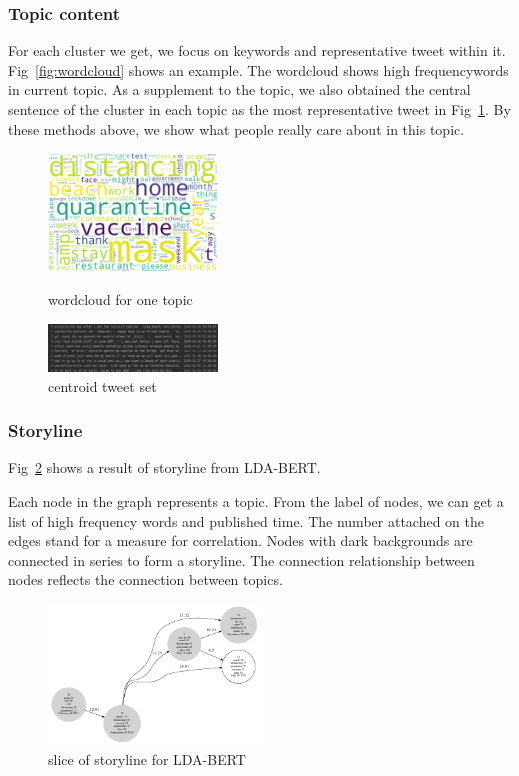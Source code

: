 \subsubsection{Topic content}
For each cluster we get, we focus on keywords and representative tweet within it. Fig~\ref{fig:wordcloud} shows an example. The wordcloud shows high frequencywords in current topic. As a supplement to the topic, we also obtained the central sentence of the cluster in each topic as the most representative tweet in Fig~\ref{fig:center_sentence}. By these methods above, we show what people really care about in this topic.
\begin{figure}
\centering
{
\includegraphics[width=0.4\textwidth]{imgs/lda_bert/Topic0_wordcloud.png}
\caption{wordcloud for one topic}
\label{fig:wordcloud}
}
\hspace{10pt}    
{
\includegraphics[width=0.4\textwidth]{imgs/lda_bert/center_sentence.png}
\caption{centroid tweet set}
\label{fig:center_sentence}
}
\hspace{10pt}
\end{figure}


\subsubsection{Storyline}
Fig~\ref{fig:storyline for lda_bert} shows a result of storyline from LDA-BERT.  

Each node in the graph represents a topic. From the label of nodes, we can get a list of high frequency words and published time. The number attached on the edges stand for a measure for correlation. Nodes with dark backgrounds are connected in series to form a storyline. The connection relationship between nodes reflects the connection between topics.

\begin{figure}[h]
\centering
\includegraphics[width=0.5\textwidth]{imgs/lda_bert/storyline_lda_bert.gv.pdf}
\caption{slice of storyline for LDA-BERT}
\label{fig:storyline for lda_bert}
\end{figure}


